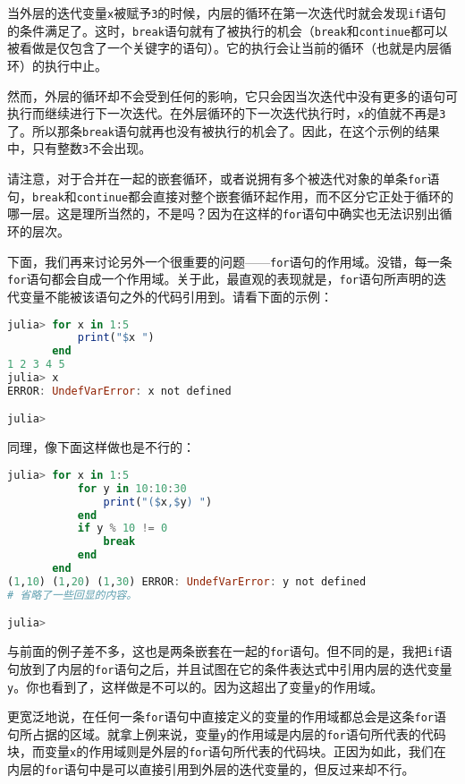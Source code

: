 当外层的迭代变量\verb|x|被赋予\verb|3|的时候，内层的循环在第一次迭代时就会发现\verb|if|语句的条件满足了。这时，\verb|break|语句就有了被执行的机会（\verb|break|和\verb|continue|都可以被看做是仅包含了一个关键字的语句）。它的执行会让当前的循环（也就是内层循环）的执行中止。

然而，外层的循环却不会受到任何的影响，它只会因当次迭代中没有更多的语句可执行而继续进行下一次迭代。在外层循环的下一次迭代执行时，\verb|x|的值就不再是\verb|3|了。所以那条\verb|break|语句就再也没有被执行的机会了。因此，在这个示例的结果中，只有整数\verb|3|不会出现。

请注意，对于合并在一起的嵌套循环，或者说拥有多个被迭代对象的单条\verb|for|语句，\verb|break|和\verb|continue|都会直接对整个嵌套循环起作用，而不区分它正处于循环的哪一层。这是理所当然的，不是吗？因为在这样的\verb|for|语句中确实也无法识别出循环的层次。

下面，我们再来讨论另外一个很重要的问题——\verb|for|语句的作用域。没错，每一条\verb|for|语句都会自成一个作用域。关于此，最直观的表现就是，\verb|for|语句所声明的迭代变量不能被该语句之外的代码引用到。请看下面的示例：
\begin{lstlisting}[language=julia]
julia> for x in 1:5
           print("$x ")
       end
1 2 3 4 5 
julia> x
ERROR: UndefVarError: x not defined

julia> 
\end{lstlisting}

同理，像下面这样做也是不行的：
\begin{lstlisting}[language=julia]
julia> for x in 1:5
           for y in 10:10:30
               print("($x,$y) ")
           end
           if y % 10 != 0 
               break
           end
       end
(1,10) (1,20) (1,30) ERROR: UndefVarError: y not defined
# 省略了一些回显的内容。

julia> 
\end{lstlisting}

与前面的例子差不多，这也是两条嵌套在一起的\verb|for|语句。但不同的是，我把\verb|if|语句放到了内层的\verb|for|语句之后，并且试图在它的条件表达式中引用内层的迭代变量\verb|y|。你也看到了，这样做是不可以的。因为这超出了变量\verb|y|的作用域。

更宽泛地说，在任何一条\verb|for|语句中直接定义的变量的作用域都总会是这条\verb|for|语句所占据的区域。就拿上例来说，变量\verb|y|的作用域是内层的\verb|for|语句所代表的代码块，而变量\verb|x|的作用域则是外层的\verb|for|语句所代表的代码块。正因为如此，我们在内层的\verb|for|语句中是可以直接引用到外层的迭代变量的，但反过来却不行。

